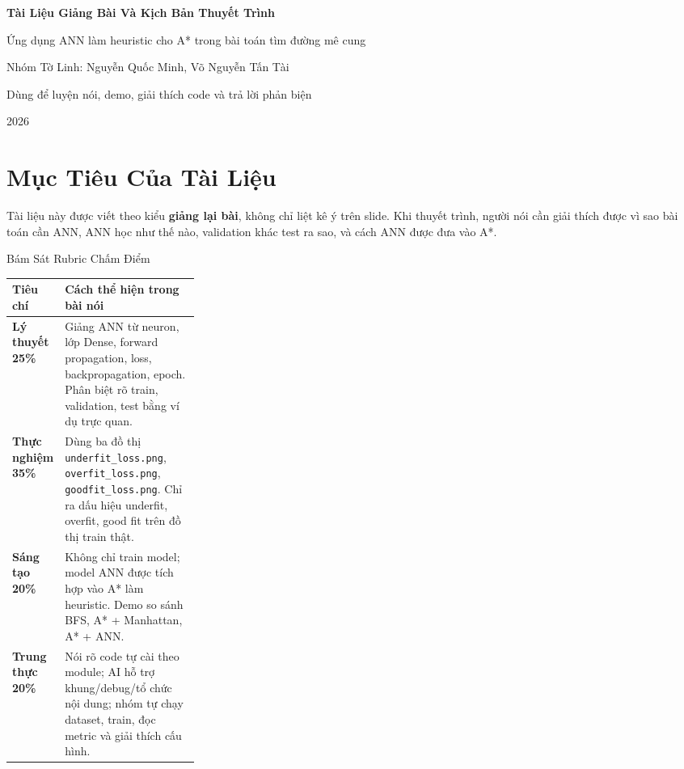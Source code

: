 \documentclass[12pt,a4paper]{article}
\newcommand{\code}[1]{\texttt{#1}}
\newcommand{\term}[1]{\textbf{#1}}
\begin{document}
\begin{titlepage}
\centering
\vspace*{1cm}
{\sffamily\bfseries\Huge Tài Liệu Giảng Bài Và Kịch Bản Thuyết Trình\par}
\vspace{0.35cm}
{\sffamily\Large Ứng dụng ANN làm heuristic cho A* trong bài toán tìm đường mê cung\par}
\vspace{1cm}
{\Large Nhóm Tờ Linh: Nguyễn Quốc Minh, Võ Nguyễn Tấn Tài\par}
\vspace{0.5cm}
{\large Dùng để luyện nói, demo, giải thích code và trả lời phản biện\par}
\vfill
{\large 2026\par}
\end{titlepage}

\tableofcontents
\newpage

\section{Mục Tiêu Của Tài Liệu}

Tài liệu này được viết theo kiểu \term{giảng lại bài}, không chỉ liệt kê ý trên slide. Khi thuyết trình, người nói cần giải thích được vì sao bài toán cần ANN, ANN học như thế nào, validation khác test ra sao, và cách ANN được đưa vào A*.

\begin{rubricbox}{Bám Sát Rubric Chấm Điểm}
\begin{tabularx}{\linewidth}{>{\bfseries}p{0.27\linewidth}X}
\toprule
Tiêu chí & Cách thể hiện trong bài nói \\
\midrule
Lý thuyết 25\% & Giảng ANN từ neuron, lớp Dense, forward propagation, loss, backpropagation, epoch. Phân biệt rõ train, validation, test bằng ví dụ trực quan. \\
Thực nghiệm 35\% & Dùng ba đồ thị \code{underfit\_loss.png}, \code{overfit\_loss.png}, \code{goodfit\_loss.png}. Chỉ ra dấu hiệu underfit, overfit, good fit trên đồ thị train thật. \\
Sáng tạo 20\% & Không chỉ train model; model ANN được tích hợp vào A* làm heuristic. Demo so sánh BFS, A* + Manhattan, A* + ANN. \\
Trung thực 20\% & Nói rõ code tự cài theo module; AI hỗ trợ khung/debug/tổ chức nội dung; nhóm tự chạy dataset, train, đọc metric và giải thích cấu hình. \\
\bottomrule
\end{tabularx}
\end{rubricbox}
\end{document}
